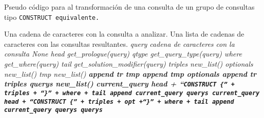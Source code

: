 \begin{algorithm}
  \caption{Pseudo código para al transformación de una consulta de un grupo
  de consultas tipo \tt{CONSTRUCT} equivalente.}\label{alg:extract}
  \begin{algorithmic}[1]
    \Require Una cadena de caracteres con la consulta a analizar.
    \Ensure Una lista de cadenas de caracteres con las consultas resultantes.
    \State \it{query} \get cadena de caracteres con la consulta
      \State \Return \it{None}
    \EndIf
    \State \it{head}  \get \it{get\_prologue}(\it{query})
    \State \it{qtype} \get \it{get\_query\_type}(\it{query})
    \State \it{where} \get \it{get\_where}(\it{query})
    \State \it{tail}  \get \it{get\_solution\_modifier}(\it{query})
    \State \it{triples}   \get \it{new\_list}()
    \State \it{optionals} \get \it{new\_list}()
        \State \it{tmp} \get \it{new\_list}()
          \State \bf{append} \it{tr} \ra \it{tmp}
        \EndFor
        \State \bf{append} \it{tmp} \ra \it{optionals}
      \Else
          \State \bf{append} \it{tr} \ra \it{triples}
        \EndFor
      \EndIf
    \EndFor
    \State \it{querys} \get \it{new\_list}()
    \State \it{current\_query} \get \it{head} + ``\tt{CONSTRUCT \{}'' + 
           \it{triples} + ``\tt{\}}'' + \it{where} + \it{tail} 
    \State \bf{append} \it{current\_query} \ra \it{querys}
      \State \it{current\_query} \get \it{head} + ``\tt{CONSTRUCT \{}'' + 
             \it{triples} + \it{opt} +``\tt{\}}'' + \it{where} + \it{tail} 
      \State \bf{append} \it{current\_query} \ra \it{querys}
    \EndFor
    \State \Return \it{querys}
  \end{algorithmic}
\end{algorithm}
